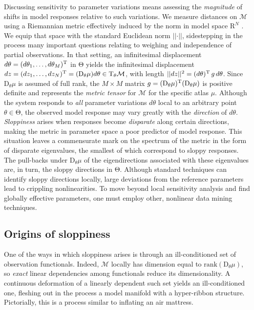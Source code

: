 \documentclass{article}
\newcommand{\D}{\mathrm{D}}
\newcommand{\norm}[1]{\vert\vert#1\vert\vert}
\newcommand{\p}{\theta}
\newcommand{\omr}{\mu}
\newcommand{\omm}{\mathcal{M}}
\newcommand{\R}{\mathrm{R}}
\newcommand{\ps}{\mathrm{\Theta}}
\begin{document}
Discussing sensitivity to parameter variations means assessing the \emph{magnitude} of shifts in model responses relative to such variations.
We measure distances on $\omm$ using a Riemannian metric effectively induced by the norm in model space $\R^N$ \cite{TMS11}.
We equip that space with the standard Euclidean norm $\norm{\cdot}$, sidestepping in the process many important questions relating to weighing and independence of partial observations.
In that setting, an infinitesimal displacement
$d\p = (d\p_1 , \ldots , d\p_M)^{\rm T}$ in $\ps$
yields the infinitesimal displacement
$dz = (dz_1 , \ldots , dz_N)^{\rm T} = (\D_\p\mu) d\p \in \mathrm{T}_\p\omm$,
with length $\norm{dz}^2 = (d\p)^{\rm T} \, g \, d\p$.
Since $\D_\p \omr$ is assumed of full rank, the $M \times M$ matrix $g = (\D_\p\omr)^{\rm T}(\D_\p\omr)$ is positive definite and represents the \emph{metric tensor} for $\omm$ for the specific atlas $\omr$.
Although the system responds to \emph{all} parameter variations $d\p$ local to an arbitrary point $\p \in \ps$, the observed model response may vary greatly with the \emph{direction} of $d\p$.
\emph{Sloppiness} arises when responses become \emph{disparate} along certain directions, making the metric in parameter space a poor predictor of model response.
This situation leaves a commensurate mark on the spectrum of the metric in the form of disparate eigenvalues, the smallest of which correspond to sloppy responses.
The pull-backs under $\D_\p \omr$ of the eigendirections
associated with these eigenvalues are, in turn, the sloppy directions in $\ps$.
Although standard techniques can identify sloppy directions locally, large deviations from the reference parameters lead to crippling nonlinearities.
To move beyond local sensitivity analysis and find globally effective parameters, one must employ other, nonlinear data mining techniques.



\subsection{Origins of sloppiness}
\label{ss-origins}
%
One of the ways in which sloppiness arises is through an ill-conditioned set of observation functionals.
Indeed, $\omm$ locally has dimension equal to $\mathrm{rank}(\D_\p \omr)$, so \emph{exact} linear dependencies among functionals reduce its dimensionality.
A continuous deformation of a linearly dependent such set yields an ill-conditioned one, fleshing out in the process a model manifold with a hyper-ribbon structure.
Pictorially, this is a process similar to inflating an air mattress.\\
\end{document}
